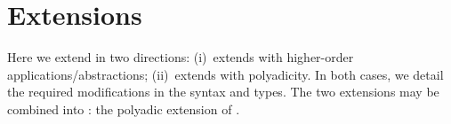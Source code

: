 \documentclass[runningheads]{llncs}
\begin{document}
{





\section{Extensions}
\label{sec:extension}
%

Here we extend \HOp in two directions: %
(i)~\HOpp  extends   \HOp with higher-order applications/abstractions;
(ii)~\PHOp   extends  \HOp
with polyadicity.
In both cases, we detail the
required modifications in the syntax and types.
The two extensions may be combined into \PHOpp: the polyadic extension of \HOpp.


}
\end{document}
